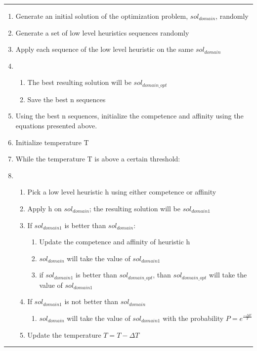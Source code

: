 \noindent\rule{\textwidth}{1pt}
\begin{enumerate}[itemsep=1pt, parsep=1pt, topsep=1pt]
    \item Generate an initial solution of the optimization problem, $sol_{domain}$, randomly
    \item Generate a set of low level heuristics sequences randomly
    \item Apply each sequence of the low level heuristic on the same $sol_{domain}$
    \item \begin{enumerate}[itemsep=1pt, parsep=1pt, topsep=1pt]
              \item The best resulting solution will be $sol_{domain\_opt}$
              \item Save the best n sequences
    \end{enumerate}
    \item Using the best n sequences, initialize the competence and affinity using the equations presented above. %
    \item Initialize temperature T
    \item While the temperature T is above a certain threshold:
    \item \begin{enumerate}[itemsep=1pt, parsep=1pt, topsep=1pt]
              \item Pick a low level heuristic h using either competence or affinity
              \item Apply h on $sol_{domain}$; the resulting solution will be $sol_{domain1}$
              \item If $sol_{domain1}$ is better than $sol_{domain}$:
              \begin{enumerate}[itemsep=1pt, parsep=1pt, topsep=1pt]
                  \item Update the competence and affinity of heuristic h
                  \item $sol_{domain}$ will take the value of $sol_{domain1}$
                  \item if $sol_{domain1}$ is better than $sol_{domain\_opt}$, than $sol_{domain\_opt}$ will take the value of $sol_{domain1}$
              \end{enumerate}
              \item If $sol_{domain1}$ is not better than $sol_{domain}$
              \begin{enumerate}[itemsep=1pt, parsep=1pt, topsep=1pt]
                  \item $sol_{domain}$ will take the value of $sol_{domain1}$ with the probability $P = e^{\frac{-\Delta E}{T}}$
              \end{enumerate}
              \item Update the temperature $T = T - \Delta T$
    \end{enumerate}
\end{enumerate}
\noindent\rule{\textwidth}{1pt}

